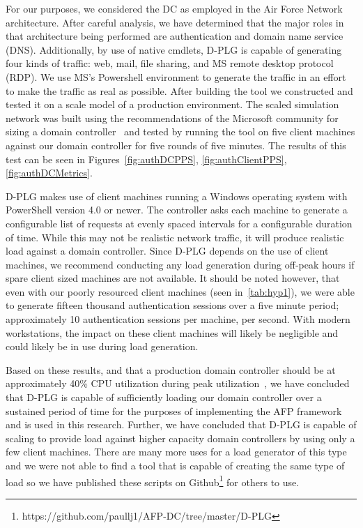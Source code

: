 For our purposes, we considered the DC as employed in the Air Force Network
architecture.  After careful analysis, we have determined that the major roles
in that architecture being performed are authentication and domain name service
(DNS).  Additionally, by use of native cmdlets, D-PLG is capable of generating
four kinds of traffic: web, mail, file sharing, and MS remote desktop protocol
(RDP).  We use MS's Powershell environment to generate the traffic in an effort
to make the traffic as real as possible.  After building the tool we
constructed and tested it on a scale model of a production environment.  The
scaled simulation network was built using the recommendations of the Microsoft
community for sizing a domain controller~\cite{mak12} and tested by running the
tool on five client machines against our domain controller for five rounds of
five minutes.  The results of this test can be seen in
Figures~\ref{fig:authDCPPS}, \ref{fig:authClientPPS}, \ref{fig:authDCMetrics}.

\figAuthDCPPS
\figAuthClientPPS
\figAuthDCMetrics

D-PLG makes use of client machines running a Windows operating system with
PowerShell version 4.0 or newer.  The controller asks each machine to generate
a configurable list of requests at evenly spaced intervals for a configurable
duration of time.  While this may not be realistic network traffic, it will
produce realistic load against a domain controller.  Since D-PLG depends on the
use of client machines, we recommend conducting any load generation during
off-peak hours if spare client sized machines are not available.  It should be
noted however, that even with our poorly resourced client machines (seen
in~\ref{tab:hyp1}), we were able to generate fifteen thousand authentication
sessions over a five minute period; approximately 10 authentication sessions
per machine, per second.  With modern workstations, the impact on these client
machines will likely be negligible and could likely be in use during load
generation.

Based on these results, and that a production domain controller should be at
approximately 40\% CPU utilization during peak utilization~\cite{mak12}, we
have concluded that D-PLG is capable of sufficiently loading our domain
controller over a sustained period of time for the purposes of implementing the
AFP framework and is used in this research.  Further, we have concluded that
D-PLG is capable of scaling to provide load against higher capacity domain
controllers by using only a few client machines.  There are many more uses for
a load generator of this type and we were not able to find a tool that is
capable of creating the same type of load so we have published these scripts on
Github\footnote{https://github.com/paullj1/AFP-DC/tree/master/D-PLG} for others
to use.

